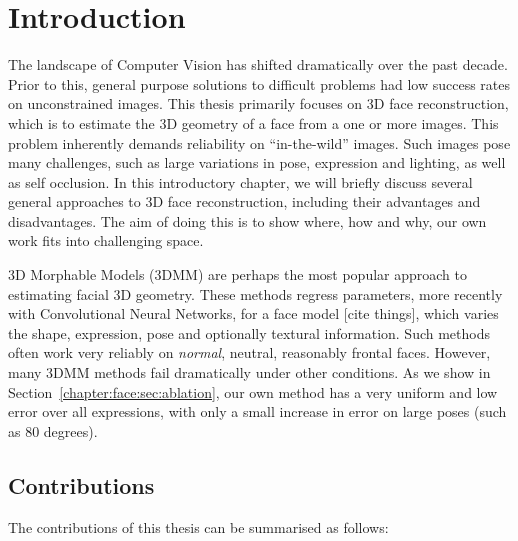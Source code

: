 \chapter{Introduction}

The landscape of Computer Vision has shifted dramatically over the
past decade. Prior to this, general purpose solutions to difficult
problems had low success rates on unconstrained images. This thesis
primarily focuses on 3D face reconstruction, which is to estimate the
3D geometry of a face from a one or more images. This problem
inherently demands reliability on ``in-the-wild'' images. Such images
pose many challenges, such as large variations in pose, expression and
lighting, as well as self occlusion. In this introductory chapter, we
will briefly discuss several general approaches to 3D face
reconstruction, including their advantages and disadvantages. The aim
of doing this is to show where, how and why, our own work fits into
challenging space.

3D Morphable Models (3DMM) are perhaps the most popular approach to
estimating facial 3D geometry. These methods regress parameters, more
recently with Convolutional Neural Networks, for a face model [cite
things], which varies the shape, expression, pose and optionally
textural information. Such methods often work very reliably on
\textit{normal}, neutral, reasonably frontal faces. However, many 3DMM
methods fail dramatically under other conditions. As we show in
Section~\ref{chapter:face:sec:ablation}, our own method has a very
uniform and low error over all expressions, with only a small increase
in error on large poses (such as 80 degrees).





\section{Contributions}

The contributions of this thesis can be summarised as follows:

